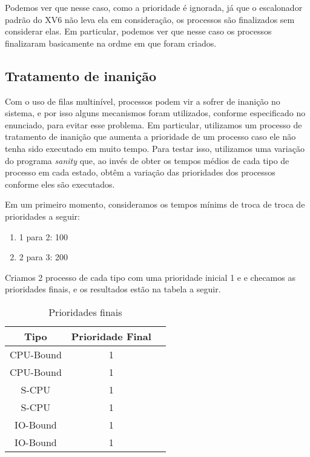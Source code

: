 \documentclass{article}
\begin{document}
Podemos ver que nesse caso, como a prioridade é ignorada, já que o escalonador
padrão do XV6 não leva ela em consideração, os processos são finalizados sem
considerar elas. Em particular, podemos ver que nesse caso os processos
finalizaram basicamente na ordme em que foram criados.

\subsection{Tratamento de inanição}

Com o uso de filas multinível, processos podem vir a sofrer de inanição no
sistema, e por isso alguns mecanismos foram utilizados, conforme especificado
no enunciado, para evitar esse problema. Em particular, utilizamos um processo
de tratamento de inanição que aumenta a prioridade de um processo caso ele não
tenha
sido executado em muito tempo. Para testar isso, utilizamos uma variação do
programa \textit{sanity} que, ao invés de obter os tempos médios de cada tipo
de processo em cada estado, obtêm a variação das prioridades dos processos
conforme eles são executados.

Em um primeiro momento, consideramos os tempos mínims de troca de troca de
prioridades a seguir:

\begin{enumerate}
      \item 1 para 2: 100
      \item 2 para 3: 200
\end{enumerate}

Criamos 2 processo de cada tipo com uma prioridade inicial 1 e e checamos as
prioridades finais, e os resultados estão na tabela a seguir.

\begin{table}[H]
      \centering
      \begin{tabular}{|c|c|c|}
            \hline
            \textbf{Tipo} & \textbf{Prioridade Final} \\
            \hline
            CPU-Bound     & 1                         \\
            CPU-Bound     & 1                         \\
            S-CPU         & 1                         \\
            S-CPU         & 1                         \\
            IO-Bound      & 1                         \\
            IO-Bound      & 1                         \\
            \hline
      \end{tabular}
      \caption{Prioridades finais}
\end{table}
\end{document}
